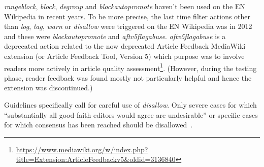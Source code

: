 \emph{rangeblock}, \emph{block}, \emph{degroup} and \emph{blockautopromote} haven't been used on the EN Wikipedia in recent years. %
To be more precise, the last time filter actions other than \emph{log}, \emph{tag}, \emph{warn} or \emph{disallow} were triggered on the EN Wikipedia was in 2012 and these were \emph{blockautopromote} and \emph{aftv5flagabuse}. %
\emph{aftv5flagabuse} is a deprecated action related to the now deprecated Article Feedback MediaWiki extension (or Article Feedback Tool, Version 5) which purpose was to involve readers more actively in article quality assessment\footnote{\url{https://www.mediawiki.org/w/index.php?title=Extension:ArticleFeedbackv5&oldid=3136840}}.
(However, during the testing phase, reader feedback was found mostly not particularly helpful and hence the extension was discontinued.)

Guidelines specifically call for careful use of \emph{disallow}.
Only severe cases for which ``substantially all good-faith editors would agree are undesirable'' or specific cases for which consensus has been reached should be disallowed~\cite{Wikipedia:EditFilter}.

